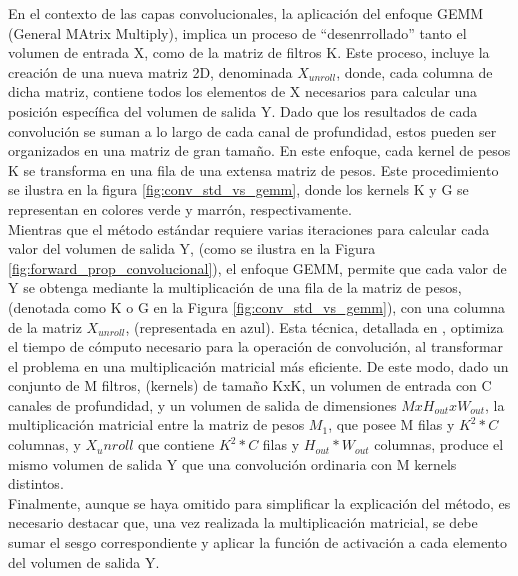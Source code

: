 En el contexto de las capas convolucionales, la aplicación del enfoque GEMM (General MAtrix Multiply), implica un proceso de ``desenrrollado'' tanto el volumen de entrada X, como de la matriz de filtros K. Este proceso, incluye la creación de una nueva matriz 2D, denominada $X_{unroll}$, donde, cada columna de dicha matriz, contiene todos los elementos de X necesarios para calcular una posición específica del volumen de salida Y. Dado que los resultados de cada convolución se suman a lo largo de cada canal de profundidad, estos pueden ser organizados en una matriz de gran tamaño. En este enfoque, cada kernel de pesos K se transforma en una fila de una extensa matriz de pesos. Este procedimiento se ilustra en la figura \ref{fig:conv_std_vs_gemm}, donde los kernels K y G se representan en colores verde y marrón, respectivamente. \\
Mientras que el método estándar requiere varias iteraciones para calcular cada valor del volumen de salida Y, (como se ilustra en la Figura \ref{fig:forward_prop_convolucional}), el enfoque GEMM, permite que cada valor de Y se obtenga mediante la multiplicación de una fila de la matriz de pesos, (denotada como K o G en la Figura \ref{fig:conv_std_vs_gemm}), con una columna de la matriz $X_{unroll}$, (representada en azul). Esta técnica, detallada en \cite{Programming_Massively}, optimiza el tiempo de cómputo necesario para la operación de convolución, al transformar el problema en una multiplicación matricial más eficiente.
De este modo, dado un conjunto de M filtros, (kernels) de tamaño KxK, un volumen de entrada con C canales de profundidad, y un volumen de salida de dimensiones $MxH_{out}xW_{out}$, la multiplicación matricial entre la matriz de pesos $M_1$, que posee M filas y $K^2*C$ columnas, y $X_unroll$ que contiene $K^2*C$ filas y $H_{out}*W_{out}$ columnas, produce el mismo volumen de salida Y que una convolución ordinaria con M kernels distintos. \\
Finalmente, aunque se haya omitido para simplificar la explicación del método, es necesario destacar que, una vez realizada la multiplicación matricial, se debe sumar el sesgo correspondiente y aplicar la función de activación a cada elemento del volumen de salida Y.

